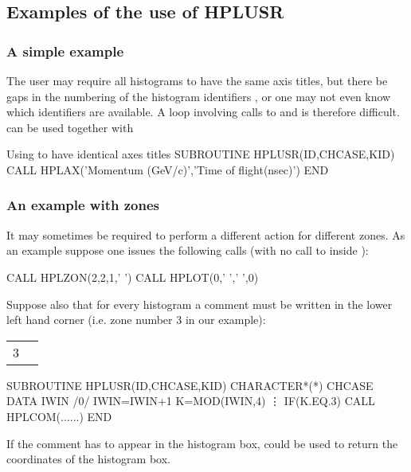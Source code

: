 \subsection*{Examples of the use of HPLUSR}
\subsubsection{A simple example}
The user may require all histograms to have the same axis titles, but there
be gaps in the numbering of the histogram identifiers , or one may not 
even know which identifiers are available. A  loop involving calls to 
 and  is therefore difficult.  can be 
used together with 
\begin{XMPt}{Using  to have identical axes titles}
      SUBROUTINE HPLUSR(ID,CHCASE,KID)
      CALL HPLAX('Momentum (GeV/c)','Time of flight(nsec)')
      END
\end{XMPt}

\subsubsection{An example with zones }
It may sometimes be required to perform a different action for different 
zones. As an example suppose one issues the following calls (with no call to 
 inside ):
\begin{XMP}
      CALL HPLZON(2,2,1,' ')
      CALL HPLOT(0,' ',' ',0)
\end{XMP}
Suppose also that for every histogram a comment must be written in the lower 
left hand corner (i.e. zone number 3 in our example):\quad

\begin{tabular}[t]{|p{1cm}|p{1cm}|}
\hline
\phantom{3}&\phantom{3}\\
\hline
 \hfil  3 &\phantom{3}\\
\hline
\end{tabular}

\begin{XMP}
      SUBROUTINE HPLUSR(ID,CHCASE,KID)
      CHARACTER*(*) CHCASE
      DATA IWIN /0/
      IWIN=IWIN+1
      K=MOD(IWIN,4)
      \vdots
      IF(K.EQ.3) CALL HPLCOM(......)
      END
\end{XMP}
If the comment has to appear in the histogram box,  could be used 
to return the coordinates of the histogram box.


